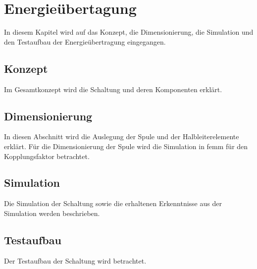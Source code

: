 \section{Energieübertagung}
In diesem Kapitel wird auf das Konzept, die Dimensionierung, die Simulation und den Testaufbau der Energieübertragung eingegangen.

\subsection{Konzept}
Im Gesamtkonzept wird die Schaltung und deren Komponenten erklärt. 

\subsection{Dimensionierung}
In diesen Abschnitt wird die Auslegung der Spule und der Halbleiterelemente erklärt. Für die Dimensionierung der Spule wird die Simulation in femm für den Kopplungsfaktor betrachtet. 

\subsection{Simulation}
Die Simulation der Schaltung sowie die erhaltenen Erkenntnisse aus der Simulation werden beschrieben.  

\subsection{Testaufbau}
Der Testaufbau der Schaltung wird betrachtet.